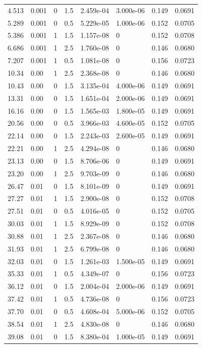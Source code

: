 \documentclass[preview]{standalone}
\begin{document}
{{\begin{tabular}{L{1.2cm}C{1.2cm} C{0.3cm}C{0.5cm} C{1.4cm}C{1.4cm} C{1.4cm}C{1.4cm}}
  4.513  &  0.001  & 0     & 1.5 &  2.459e-04  & 3.000e-06  & 0.149 &  0.0691   \\ 
  5.289  &  0.001  & 0     & 0.5 &  5.229e-05  & 1.000e-06  & 0.152 &  0.0705   \\ 
  5.386  &  0.001  & 1     & 1.5 &  1.157e-08  & 0  & 0.152 &  0.0708   \\ 
  6.686  &  0.001  & 1     & 2.5 &  1.760e-08  & 0  & 0.146 &  0.0680   \\ 
  7.207  &  0.001  & 1     & 0.5 &  1.081e-08  & 0  & 0.156 &  0.0723   \\ 
  10.34  &  0.00  & 1     & 2.5 &  2.368e-08  & 0  & 0.146 &  0.0680   \\ 
  10.43  &  0.00  & 0     & 1.5 &  3.135e-04  & 4.000e-06  & 0.149 &  0.0691   \\ 
  13.31  &  0.00  & 0     & 1.5 &  1.651e-04  & 2.000e-06  & 0.149 &  0.0691   \\ 
  16.16  &  0.00  & 0     & 1.5 &  1.565e-03  & 1.800e-05  & 0.149 &  0.0691   \\ 
  20.56  &  0.00  & 0     & 0.5 &  3.966e-03  & 4.600e-05  & 0.152 &  0.0705   \\ 
  22.14  &  0.00  & 0     & 1.5 &  2.243e-03  & 2.600e-05  & 0.149 &  0.0691   \\ 
  22.21  &  0.00  & 1     & 2.5 &  4.294e-08  & 0  & 0.146 &  0.0680   \\ 
  23.13  &  0.00  & 0     & 1.5 &  8.706e-06  & 0  & 0.149 &  0.0691   \\ 
  23.20  &  0.00  & 1     & 2.5 &  9.703e-09  & 0  & 0.146 &  0.0680   \\ 
  26.47  &  0.01  & 0     & 1.5 &  8.101e-09  & 0  & 0.149 &  0.0691   \\ 
  27.27  &  0.01  & 1     & 1.5 &  2.900e-08  & 0  & 0.152 &  0.0708   \\ 
  27.51  &  0.01  & 0     & 0.5 &  4.016e-05  & 0  & 0.152 &  0.0705   \\ 
  30.03  &  0.01  & 1     & 1.5 &  8.929e-09  & 0  & 0.152 &  0.0708   \\ 
  30.88  &  0.01  & 1     & 2.5 &  2.367e-08  & 0  & 0.146 &  0.0680   \\ 
  31.93  &  0.01  & 1     & 2.5 &  6.799e-08  & 0  & 0.146 &  0.0680   \\ 
  32.03  &  0.01  & 0     & 1.5 &  1.261e-03  & 1.500e-05  & 0.149 &  0.0691   \\ 
  35.33  &  0.01  & 1     & 0.5 &  4.349e-07  & 0  & 0.156 &  0.0723   \\ 
  36.12  &  0.01  & 0     & 1.5 &  2.004e-04  & 2.000e-06  & 0.149 &  0.0691   \\ 
  37.42  &  0.01  & 1     & 0.5 &  4.736e-08  & 0  & 0.156 &  0.0723   \\ 
  37.70  &  0.01  & 0     & 0.5 &  4.608e-04  & 5.000e-06  & 0.152 &  0.0705   \\ 
  38.54  &  0.01  & 1     & 2.5 &  4.830e-08  & 0  & 0.146 &  0.0680   \\ 
  39.08  &  0.01  & 0     & 1.5 &  8.380e-04  & 1.000e-05  & 0.149 &  0.0691   \\ 
\hline 
\end{tabular} 

}}
\end{document}
